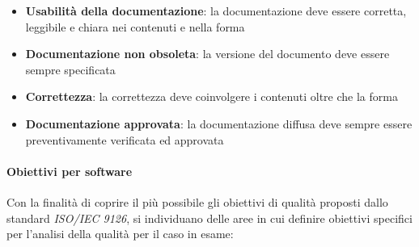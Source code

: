 \documentclass[12pt,a4paper]{article}
\begin{document}
\begin{itemize}
	\item\textbf{Usabilità della documentazione}: la documentazione deve essere corretta, leggibile e chiara nei contenuti e nella forma
	\item\textbf{Documentazione non obsoleta}: la versione del documento deve essere sempre specificata
	\item\textbf{Correttezza}: la correttezza deve coinvolgere i contenuti oltre che la forma
	\item\textbf{Documentazione approvata}: la documentazione diffusa deve sempre essere preventivamente verificata ed approvata
\end{itemize}

\paragraph{Obiettivi per software}
Con la finalità di coprire il più possibile gli obiettivi di qualità proposti dallo standard \textit{ISO/IEC 9126}, si individuano delle aree in cui definire obiettivi specifici per l'analisi della qualità  per il caso in esame:
\end{document}
